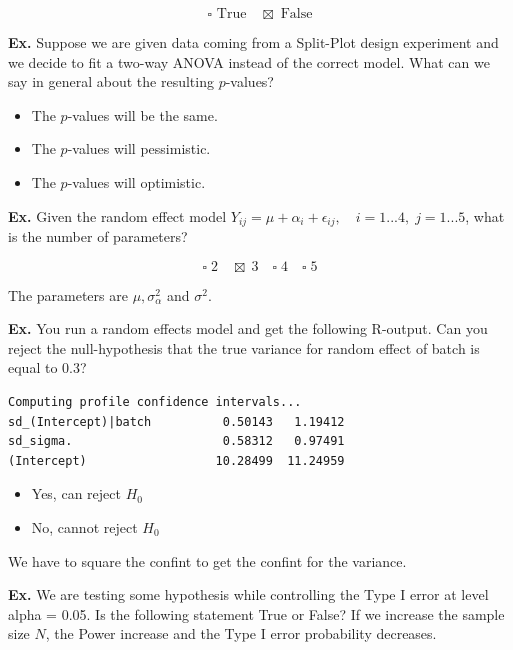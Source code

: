 $$\square \text{ True} \quad \boxtimes \text{ False}$$


\hrulefill

\textbf{Ex.} Suppose we are given data coming from a Split-Plot design experiment and we decide to fit a two-way ANOVA instead of the correct model. What can we say in general about the resulting $p$-values?

\begin{itemize}
	\item[$\square$] The $p$-values will be the same.
	\item[$\square$] The $p$-values will pessimistic.
	\item[$\boxtimes$] The $p$-values will optimistic.
\end{itemize}


\hrulefill

\textbf{Ex.} Given the random effect model $Y_{ij} = \mu + \alpha_i + \epsilon_{ij}, \quad i = 1...4,\; j = 1...5$, what is the number of parameters?

$$\square \; 2 \quad \boxtimes \; 3 \quad \square \; 4 \quad \square \; 5 $$

The parameters are $\mu, \sigma_\alpha^2$ and $\sigma^2$.


\hrulefill

\textbf{Ex.} You run a random effects model and get the following R-output. Can you reject the null-hypothesis that the true variance for random effect of batch is equal to 0.3?

\begin{lstlisting}
Computing profile confidence intervals... 
sd_(Intercept)|batch          0.50143   1.19412
sd_sigma.                     0.58312   0.97491
(Intercept)                  10.28499  11.24959 
\end{lstlisting}

\begin{itemize}
	\item[$\square$] Yes, can reject $H_0$
 	\item[$\boxtimes$] No, cannot reject $H_0$
\end{itemize}
We have to square the confint to get the confint for the variance.


\hrulefill

\textbf{Ex.} We are testing some hypothesis while controlling the Type I error at level alpha = 0.05. Is the following statement True or False? If we increase the sample size $N$, the Power increase and the Type I error probability decreases.

